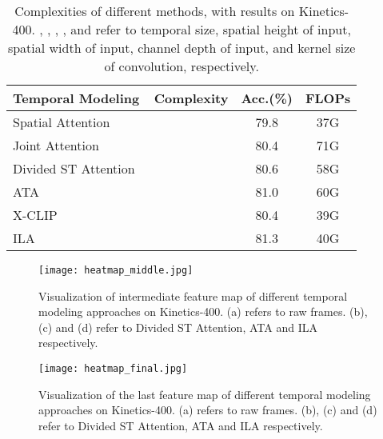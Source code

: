 \documentclass[10pt,twocolumn,letterpaper]{article}
\begin{document}
\begin{table*}[t!]
\caption{Complexities of different methods, with results on Kinetics-400. , , , , and  refer to temporal size, spatial height of input, spatial width of input, channel depth of input, and kernel size of convolution, respectively.}
\begin{center}
\begin{tabular}{lccc}
\hline
Temporal Modeling    & Complexity                                                                                                       & Acc.(\%) & FLOPs \\ \hline
Spatial Attention~\cite{b13}    &                                                                     & 79.8     & 37G   \\
Joint Attention~\cite{b13}      &                                                 & 80.4     & 71G       \\
Divided ST Attention~\cite{b13} &                                             & 80.6     & 58G   \\
ATA~\cite{b28}                  &  & 81.0     & 60G   \\
X-CLIP~\cite{b24}                  &  & 80.4     & 39G   \\
ILA                  &                          & 81.3     & 40G   \\ \hline
\end{tabular}
\end{center}
\label{table:complex}
\end{table*}

\begin{figure*}[htbp]
\begin{center}
\texttt{[image: heatmap\_middle.jpg]}
\end{center}
  \caption{Visualization of intermediate feature map of different temporal modeling approaches on Kinetics-400. (a) refers to raw frames. (b), (c) and (d) refer to Divided ST Attention, ATA and ILA respectively.}
\label{fig:heatmap_middle}
\end{figure*}

\begin{figure*}[htbp]
\begin{center}
\texttt{[image: heatmap\_final.jpg]}
\end{center}
  \caption{Visualization of the last feature map of different temporal modeling approaches on Kinetics-400. (a) refers to raw frames. (b), (c) and (d) refer to Divided ST Attention, ATA and ILA respectively.}
\label{fig:heatmap_final}
\end{figure*}
\end{document}
